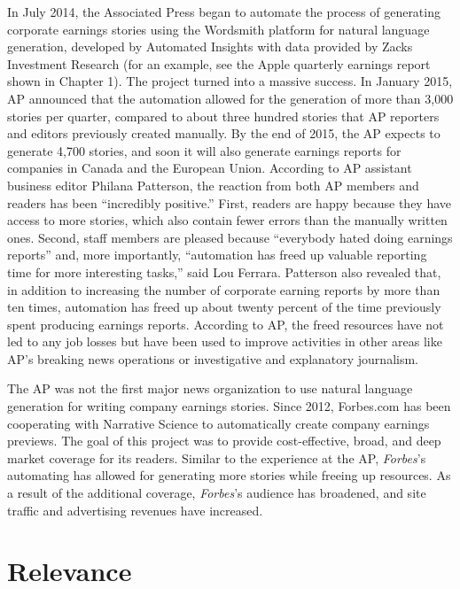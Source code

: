 \documentclass[notoc, symmetric, nobib, nols]{towcenter-guideto-book}
\begin{document}
In July 2014, the Associated Press began to automate the process of generating corporate earnings stories using the Wordsmith platform for natural language generation, developed by Automated Insights with data provided by Zacks Investment Research (for an example, see the Apple quarterly earnings report shown in Chapter 1). The project turned into a massive success. In January 2015, AP announced that the automation allowed for the generation of more than 3,000 stories per quarter, compared to about three hundred stories that AP reporters and editors previously created manually. By the end of 2015, the AP expects to generate 4,700 stories, and soon it will also generate earnings reports for companies in Canada and the European Union. According to AP assistant business editor Philana Patterson, the reaction from both AP members and readers has been ``incredibly positive.''\autocite{white15} First, readers are happy because they have access to more stories, which also contain fewer errors than the manually written ones. Second, staff members are pleased because ``everybody hated doing earnings reports'' and, more importantly, ``automation has freed up valuable reporting time for more interesting tasks,'' said Lou Ferrara. Patterson also revealed that, in addition to increasing the number of corporate earning reports by more than ten times, automation has freed up about twenty percent of the time previously spent producing earnings reports. According to AP, the freed resources have not led to any job losses but have been used to improve activities in other areas like AP's breaking news operations or investigative and explanatory journalism.\autocite{white15}  

The AP was not the first major news organization to use natural language generation for writing company earnings stories. Since 2012, Forbes.com has been cooperating with Narrative Science to automatically create company earnings previews. The goal of this project was to provide cost-effective, broad, and deep market coverage for its readers. Similar to the experience at the AP, \textit{Forbes}'s automating has allowed for generating more stories while freeing up resources. As a result of the additional coverage, \textit{Forbes}'s audience has broadened, and site traffic and advertising revenues have increased.\cite{ns13}

\section{Relevance}
\end{document}
